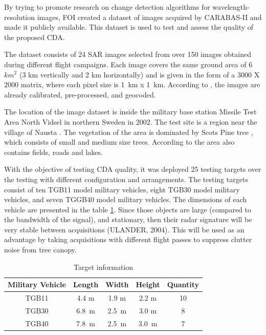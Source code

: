 By trying to promote research on change detection algorithms for wavelength-resolution
images, FOI created a dataset of images acquired by CARABAS-II and made it publicly available. 
This dataset is used to test and assess the quality of the proposed CDA.

The dataset consists of 24 SAR images selected from over 150 images obtained during different flight campaigns.
Each image covers the same ground area of 6 $km^2$ (3 km vertically and 2 km horizontally)
and is given in the form of a 3000 X 2000 matrix, where each pixel size is 1 km x 1 km.
According to \cite{ 77,62,78}, the images are already calibrated, pre-processed, and geocoded.

The location of the image dataset is inside the military base station Missile Test Area North
Vidsel in northern Sweden in 2002. The test site is a region near the village of Nausta \cite{75}.
The vegetation of the area is dominated by Scots Pine tree \cite{ 76}, which consists of small and medium size trees.
According to \cite{75} the area also contains fields, roads and lakes.

With the objective of testing CDA quality, it was deployed 25 testing targets over the testing with different configuration 
and arrangements. The testing targets consist of ten TGB11 model military vehicles, eight TGB30 model 
military vehicles, and seven TGGB40 model military vehicles. The dimensions of each vehicle are presented in the table \ref{tab:vehicle_dimensions}. Since those objects
are large (compared to the bandwidth of the signal), and stationary, then their radar
signature will be very stable between acquisitions (ULANDER, 2004). This will be used
as an advantage by taking acquisitions with different flight passes to suppress clutter noise from tree canopy.

\begin{table}[H]
    \centering
    \begin{tabular}{|c|c|c|c|c|}
        \hline 
        Military Vehicle & Length & Width & Height & Quantity \\ \hline \hline
        TGB11 & 4.4 m & 1.9 m & 2.2 m & 10 \\ \hline
        TGB30 & 6.8 m & 2.5 m & 3.0 m & 8 \\ \hline
        TGB40 & 7.8 m & 2.5 m & 3.0 m & 7 \\ \hline
    \end{tabular}
    \caption{Target information}
    \label{tab:vehicle_dimensions}
\end{table}


